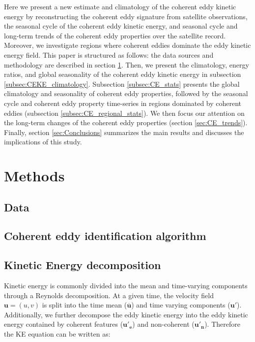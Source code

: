 \documentclass[draft,linenumbers]{agujournal2019}
\begin{document}
Here we present a new estimate and climatology of the coherent eddy kinetic energy by reconstructing the coherent eddy signature from satellite observations, the seasonal cycle of the coherent eddy kinetic energy, and seasonal cycle and long-term trends of the coherent eddy properties over the satellite record. 
Moreover, we investigate regions where coherent eddies dominate the eddy kinetic energy field. 
This paper is structured as follows:  the data sources and methodology are described in section \ref{sec:Methods}.
Then, we present the climatology, energy ratios, and global seasonality of the coherent eddy kinetic energy in subsection \ref{subsec:CEKE_climatology}. 
Subsection \ref{subsec:CE_stats} presents the global climatology and seasonality of coherent eddy properties, followed by the seasonal cycle and coherent eddy property time-series in regions dominated by coherent eddies (subsection \ref{subsec:CE_regional_stats}). 
We then focus our attention on the long-term changes of the coherent eddy properties (section \ref{sec:CE_trends}). 
Finally, section \ref{sec:Conclusions} summarizes the main results and discusses the implications of this study.

\section{Methods}
\label{sec:Methods}
	\subsection{Data}
	

	\subsection{Coherent eddy identification algorithm}


	\subsection{Kinetic Energy decomposition}

	Kinetic energy is commonly divided into the mean and time-varying components through a Reynolds decomposition. At a given time, the velocity field $\mathbf{u} = (u,v)$ is split into the time mean ($\mathbf{\overline{u}}$) and time varying components ($\mathbf{u'}$). Additionally, we further decompose the eddy kinetic energy into the eddy kinetic energy contained by coherent features ($\mathbf{u'_e}$) and non-coherent ($\mathbf{u'_n}$). Therefore the KE equation can be written as:
	
\end{document}
